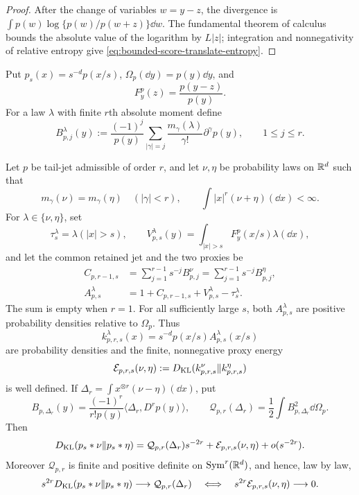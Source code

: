 \begin{proof}
After the change of variables \(w=y-z\), the divergence is
\(\int p(w)\log\{p(w)/p(w+z)\}\dd w\).  The fundamental theorem of
calculus bounds the absolute value of the logarithm by \(L|z|\); integration
and nonnegativity of relative entropy give
\eqref{eq:bounded-score-translate-entropy}.
\end{proof}

Put \(p_s(x)=s^{-d}p(x/s)\),
\(\Omega_p(\dd y)=p(y)\dd y\), and
\[
 F_y^p(z)=\frac{p(y-z)}{p(y)}.
\]
For a law \(\lambda\) with finite \(r\)th absolute moment define
\[
 B_{p,j}^\lambda(y):=
 \frac{(-1)^j}{p(y)}
 \sum_{|\gamma|=j}\frac{m_\gamma(\lambda)}{\gamma!}
 \partial^\gamma p(y),\qquad 1\le j\le r.
\]

\begin{theorem}
\label{thm:abstract-positive-tail-jet-kernel}
Let \(p\) be tail-jet admissible of order \(r\), and let \(\nu,\eta\) be
probability laws on \(\mathbb{R}^d\) such that
\[
 m_\gamma(\nu)=m_\gamma(\eta)\quad(|\gamma|<r),
 \qquad \int |x|^r(\nu+\eta)(\dd x)<\infty.
\]
For \(\lambda\in\{\nu,\eta\}\), set
\[
 \tau_s^\lambda=\lambda(|x|>s),\qquad
 V_{p,s}^\lambda(y)=
 \int_{|x|>s}F_y^p(x/s)\lambda(\dd x),
\]
and let the common retained jet and the two proxies be
\begin{align*}
 C_{p,r-1,s}
 &=\sum_{j=1}^{r-1}s^{-j}B_{p,j}^\nu
  =\sum_{j=1}^{r-1}s^{-j}B_{p,j}^\eta,\\
 A_{p,s}^\lambda
 &=1+C_{p,r-1,s}+V_{p,s}^\lambda-\tau_s^\lambda.
\end{align*}
The sum is empty when \(r=1\).  For all sufficiently large \(s\), both
\(A_{p,s}^\lambda\) are positive probability densities relative to
\(\Omega_p\).  Thus
\[
 k_{p,r,s}^\lambda(x)=s^{-d}p(x/s)A_{p,s}^\lambda(x/s)
\]
are probability densities and the finite, nonnegative proxy energy
\[
 \mathcal E_{p,r,s}(\nu,\eta)
 :=D_{\rm KL}(k_{p,r,s}^\nu\|k_{p,r,s}^\eta)
\]
is well defined.  If
\(\Delta_r=\int x^{\otimes r}(\nu-\eta)(\dd x)\), put
\[
 B_{p,\Delta_r}(y)=
 \frac{(-1)^r}{r!p(y)}\langle\Delta_r,D^rp(y)\rangle,
 \qquad
 \mathcal Q_{p,r}(\Delta_r)
 =\frac12\int B_{p,\Delta_r}^2\dd\Omega_p.
\]
Then
\begin{equation}\label{eq:abstract-tail-defect-decomposition}
 D_{\rm KL}(p_s*\nu\|p_s*\eta)
 =\mathcal Q_{p,r}(\Delta_r)s^{-2r}
  +\mathcal E_{p,r,s}(\nu,\eta)+o(s^{-2r}).
\end{equation}
Moreover \(\mathcal Q_{p,r}\) is finite and positive definite on
\(\operatorname{Sym}^r(\mathbb{R}^d)\), and hence, law by law,
\[
 s^{2r}D_{\rm KL}(p_s*\nu\|p_s*\eta)
 \longrightarrow\mathcal Q_{p,r}(\Delta_r)
 \quad\Longleftrightarrow\quad
 s^{2r}\mathcal E_{p,r,s}(\nu,\eta)\longrightarrow0.
\]
\end{theorem}

